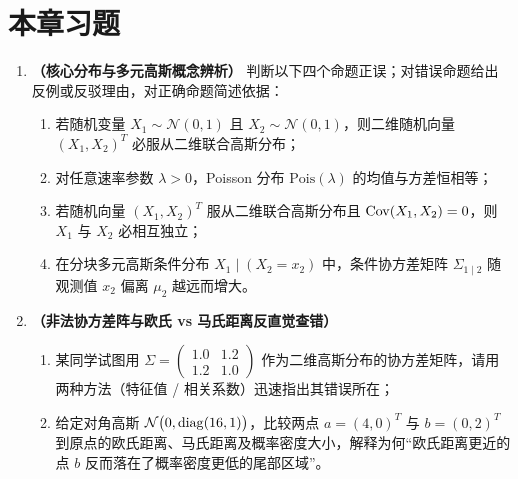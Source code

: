 \section{本章习题}
\label{sec:ch2-exercises}


\begin{enumerate}[label=\textbf{2.\arabic*}, leftmargin=2.4em]
  \item \textbf{（核心分布与多元高斯概念辨析）} 判断以下四个命题正误；对错误命题给出反例或反驳理由，对正确命题简述依据：
  \begin{enumerate}[label=(\alph*), leftmargin=1.8em]
    \item 若随机变量 $X_1 \sim \mathcal{N}(0, 1)$ 且 $X_2 \sim \mathcal{N}(0, 1)$，则二维随机向量 $(X_1, X_2)^T$ 必服从二维联合高斯分布；
    \item 对任意速率参数 $\lambda > 0$，Poisson 分布 $\mathrm{Pois}(\lambda)$ 的均值与方差恒相等；
    \item 若随机向量 $(X_1, X_2)^T$ 服从二维联合高斯分布且 $\operatorname{Cov}(X_1, X_2) = 0$，则 $X_1$ 与 $X_2$ 必相互独立；
    \item 在分块多元高斯条件分布 $X_1 \mid (X_2 = x_2)$ 中，条件协方差矩阵 $\Sigma_{1\mid 2}$ 随观测值 $x_2$ 偏离 $\mu_2$ 越远而增大。
  \end{enumerate}

  \item \textbf{（非法协方差阵与欧氏 vs 马氏距离反直觉查错）}
  \begin{enumerate}[label=(\arabic*), leftmargin=1.8em]
    \item 某同学试图用 $\Sigma = \begin{pmatrix} 1.0 & 1.2 \\ 1.2 & 1.0 \end{pmatrix}$ 作为二维高斯分布的协方差矩阵，请用两种方法（特征值 / 相关系数）迅速指出其错误所在；
    \item 给定对角高斯 $\mathcal{N}\bigl(0, \operatorname{diag}(16, 1)\bigr)$，比较两点 $a = (4, 0)^T$ 与 $b = (0, 2)^T$ 到原点的欧氏距离、马氏距离及概率密度大小，解释为何“欧氏距离更近的点 $b$ 反而落在了概率密度更低的尾部区域”。
  \end{enumerate}
\end{enumerate}


